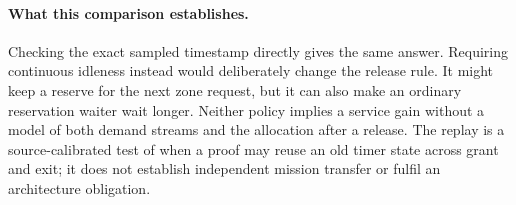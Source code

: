 \documentclass{article}
\begin{document}
\paragraph{What this comparison establishes.}
Checking the exact sampled timestamp directly gives the same answer. Requiring continuous idleness instead would deliberately change the release rule. It might keep a reserve for the next zone request, but it can also make an ordinary reservation waiter wait longer. Neither policy implies a service gain without a model of both demand streams and the allocation after a release. The replay is a source-calibrated test of when a proof may reuse an old timer state across grant and exit; it does not establish independent mission transfer or fulfil an architecture obligation.
\end{document}
